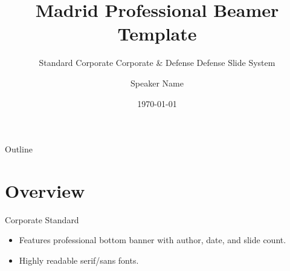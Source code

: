 \documentclass{beamer}
\title{Madrid Professional Beamer Template}
\subtitle{Standard Corporate \Standard Corporate & Defense Defense Slide System}
\date{\today}
\author{Speaker Name}
\institute{Global University}
\begin{document}
\maketitle

\begin{frame}{Outline}
  \tableofcontents
\end{frame}

\section{Overview}
\begin{frame}{Corporate Standard}
  \begin{itemize}
    \item Features professional bottom banner with author, date, and slide count.
    \item Highly readable serif/sans fonts.
  \end{itemize}
\end{frame}
\end{document}
